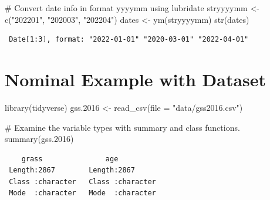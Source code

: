 \documentclass[
  letterpaper,
  DIV=11,
  numbers=noendperiod]{scrreprt}
\newenvironment{Shaded}{\begin{snugshade}}{\end{snugshade}}
\newcommand{\AttributeTok}[1]{\textcolor[rgb]{0.40,0.45,0.13}{#1}}
\newcommand{\CommentTok}[1]{\textcolor[rgb]{0.37,0.37,0.37}{#1}}
\newcommand{\FloatTok}[1]{\textcolor[rgb]{0.68,0.00,0.00}{#1}}
\newcommand{\FunctionTok}[1]{\textcolor[rgb]{0.28,0.35,0.67}{#1}}
\newcommand{\NormalTok}[1]{\textcolor[rgb]{0.00,0.23,0.31}{#1}}
\newcommand{\OtherTok}[1]{\textcolor[rgb]{0.00,0.23,0.31}{#1}}
\newcommand{\SpecialCharTok}[1]{\textcolor[rgb]{0.37,0.37,0.37}{#1}}
\newcommand{\StringTok}[1]{\textcolor[rgb]{0.13,0.47,0.30}{#1}}
\begin{document}
\begin{Shaded}
\begin{Highlighting}[]
\CommentTok{\# Convert date info in format \textquotesingle{}yyyymm\textquotesingle{} using lubridate}
\NormalTok{stryyyymm }\OtherTok{\textless{}{-}} \FunctionTok{c}\NormalTok{(}\StringTok{"202201"}\NormalTok{, }\StringTok{"202003"}\NormalTok{, }\StringTok{"202204"}\NormalTok{)}
\NormalTok{dates }\OtherTok{\textless{}{-}} \FunctionTok{ym}\NormalTok{(stryyyymm)}
\FunctionTok{str}\NormalTok{(dates)}
\end{Highlighting}
\end{Shaded}

\begin{verbatim}
 Date[1:3], format: "2022-01-01" "2020-03-01" "2022-04-01"
\end{verbatim}

\section{Nominal Example with
Dataset}\label{nominal-example-with-dataset}

\begin{Shaded}
\begin{Highlighting}[]
\FunctionTok{library}\NormalTok{(tidyverse)}
\NormalTok{gss}\FloatTok{.2016} \OtherTok{\textless{}{-}} \FunctionTok{read\_csv}\NormalTok{(}\AttributeTok{file =} \StringTok{"data/gss2016.csv"}\NormalTok{)}
\end{Highlighting}
\end{Shaded}

\begin{Shaded}
\begin{Highlighting}[]
\CommentTok{\# Examine the variable types with summary and class functions.}
\FunctionTok{summary}\NormalTok{(gss}\FloatTok{.2016}\NormalTok{)}
\end{Highlighting}
\end{Shaded}

\begin{verbatim}
    grass               age           
 Length:2867        Length:2867       
 Class :character   Class :character  
 Mode  :character   Mode  :character  
\end{verbatim}

\begin{Shaded}
\end{Shaded}
\end{document}
